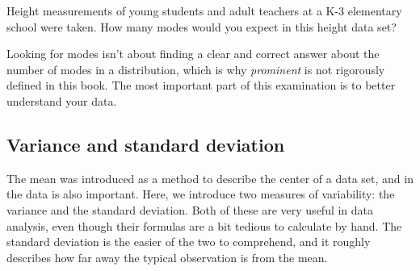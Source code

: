 %

\begin{exercisewrap}
\begin{nexercise}
Height measurements of young students and adult teachers
at a K-3 elementary school were taken.
How many modes would you expect in this height
data set?\footnotemark{}
\end{nexercise}
\end{exercisewrap}

Looking for modes isn't about finding a clear and correct
answer about the number of modes in a distribution,
which is why \emph{prominent} is not
rigorously defined in this book.
The most important part of this examination is to better
understand your data.



\subsection{Variance and standard deviation}
\label{variability}

The mean was introduced as a method to describe the center of
a data set, and  in the
data is also important.
Here, we introduce two measures of variability:
the variance and the standard deviation.
Both of these are very useful in data analysis,
even though their formulas are a bit tedious to calculate
by hand.
The standard deviation is the easier of the two to comprehend,
and it roughly describes how far away the typical observation
is from the mean.


